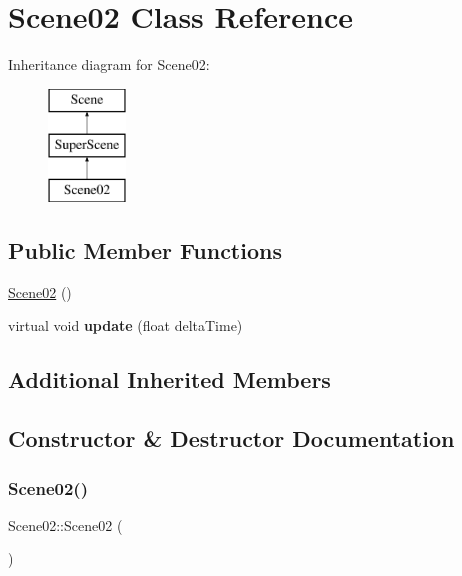 \hypertarget{class_scene02}{}\section{Scene02 Class Reference}
\label{class_scene02}
Inheritance diagram for Scene02\+:\begin{figure}[H]
\begin{center}
\leavevmode
\includegraphics[height=3.000000cm]{class_scene02}
\end{center}
\end{figure}
\subsection*{Public Member Functions}
\begin{DoxyCompactItemize}
\item 
\hyperlink{class_scene02_a961d6fa8c7dddc46ad13959d864ff332}{Scene02} ()
\item 
\mbox{\label{class_scene02_af02675b877854ee94598058b0e48f042}} 
virtual void {\bfseries update} (float delta\+Time)
\end{DoxyCompactItemize}
\subsection*{Additional Inherited Members}


\subsection{Constructor \& Destructor Documentation}
\mbox{\label{class_scene02_a961d6fa8c7dddc46ad13959d864ff332}} 
\subsubsection{\texorpdfstring{Scene02()}{Scene02()}}
{\footnotesize\ttfamily Scene02\+::\+Scene02 (\begin{DoxyParamCaption}{ }\end{DoxyParamCaption})}

